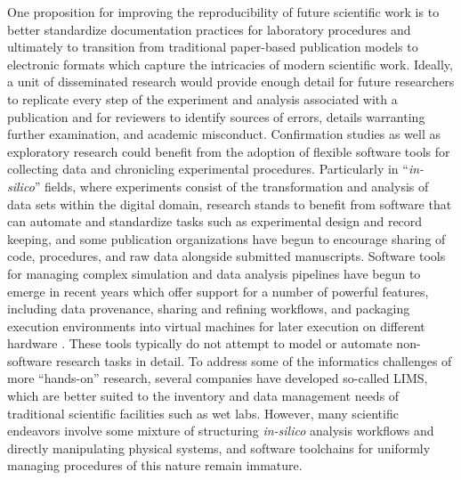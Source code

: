\documentclass[../thesis]{subfiles}
\begin{document}
One proposition for improving the reproducibility of future scientific
work is to better standardize documentation practices for laboratory
procedures \cite{10.1371/journal.pmed.0020124} and ultimately to
transition from traditional paper-based publication models to
electronic formats which capture the intricacies of modern scientific
work. Ideally, a unit of disseminated research would provide enough
detail for future researchers to replicate every step of the
experiment and analysis associated with a publication and for
reviewers to identify sources of errors, details warranting further
examination, and academic misconduct. Confirmation studies as well as
exploratory research could benefit from the adoption of flexible
software tools for collecting data and chronicling experimental
procedures. Particularly in ``\textit{in-silico}'' fields, where
experiments consist of the transformation and analysis of data sets
within the digital domain, research stands to benefit from
software that can automate and standardize tasks such as
experimental design and record keeping, and some publication
organizations have begun to encourage sharing of code, procedures, and
raw data alongside submitted manuscripts.
Software tools for managing complex simulation and data analysis
pipelines have begun to emerge in recent years which offer support for a number of powerful features,
including data provenance, sharing and refining workflows, and
packaging execution environments into virtual machines for
later execution on different hardware \cite{VisTrails, Taverna}.
These tools typically do not attempt to model or automate non-software
research tasks in detail.
To address some of the informatics challenges of more ``hands-on''
research, several companies have developed
so-called \gls{LIMS}, which are
better suited to the inventory and data management needs of
traditional scientific facilities such as wet labs.
However, many scientific endeavors involve some mixture of
structuring \textit{in-silico} analysis workflows and directly
manipulating physical systems, and software toolchains for uniformly
managing procedures of this nature remain immature.
\end{document}
